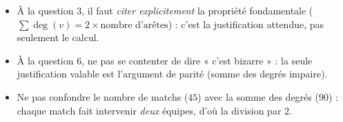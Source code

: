 \documentclass[11pt]{article}
\begin{document}
\begin{attention}
\begin{itemize}
\item À la question 3, il faut \emph{citer explicitement} la propriété fondamentale ($\sum \deg(v) = 2 \times \text{nombre d'arêtes}$) : c'est la justification attendue, pas seulement le calcul.
\item À la question 6, ne pas se contenter de dire « c'est bizarre » : la seule justification valable est l'argument de parité (somme des degrés impaire).
\item Ne pas confondre le nombre de matchs ($45$) avec la somme des degrés ($90$) : chaque match fait intervenir \emph{deux} équipes, d'où la division par $2$.
\end{itemize}
\end{attention}
\end{document}
